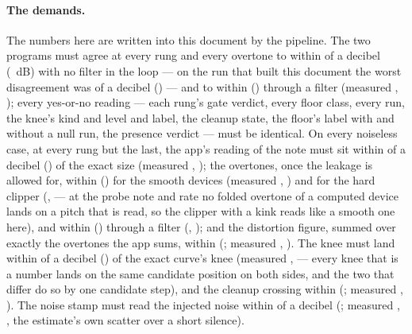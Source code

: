 \documentclass[11pt,a4paper]{article}
\begin{document}
\paragraph{The demands.} The numbers here are written into this document
by the pipeline. The two programs must agree at every rung and every overtone to within
\cparitySwiftToleranceWords{} of a decibel (\cparitySwiftTolerance{}~dB)
with no filter in the loop --- on the run that built this document the
worst disagreement was \cparityWorstSwiftWords{} of a decibel
(\cparityWorstSwift{}) --- and to within
\cparitySwiftFilteredToleranceWords{} (\cparitySwiftFilteredTolerance{})
through a filter (measured \cparityWorstSwiftFilteredWords{},
\cparityWorstSwiftFiltered{}); every yes-or-no reading --- each rung's
gate verdict, every floor class, every run, the knee's kind and level and
label, the cleanup state, the floor's label with and without a null run,
the presence verdict --- must be identical. On every noiseless case, at
every rung but the last, the app's reading of the note must sit within
\cparityHOneWords{} of a decibel (\cparityHOne{}) of the exact size
(measured \cparityWorstHOneWords{}, \cparityWorstHOne{}); the overtones,
once the leakage is allowed for, within \cparityTruthSmoothWords{}
(\cparityTruthSmooth{}) for the smooth devices (measured
\cparityWorstResidueSmoothWords{}, \cparityWorstResidueSmooth{}) and for
the hard clipper (\cparityWorstResidueKinkedWords{},
\cparityWorstResidueKinked{} --- at the probe note and rate no folded
overtone of a computed device lands on a pitch that is read, so the
clipper with a kink reads like a smooth one here), and within
\cparityTruthFilteredWords{} (\cparityTruthFiltered{}) through a filter
(\cparityWorstResidueFilteredWords{}, \cparityWorstResidueFiltered{}); and
the distortion figure, summed over exactly the overtones the app sums,
within \cparityTHDWords{} (\cparityTHD{}; measured
\cparityWorstTHDResidueWords{}, \cparityWorstTHDResidue{}). The knee must
land within \cparityKneeWords{} of a decibel (\cparityKnee{}) of the exact
curve's knee (measured \cparityWorstKneeWords{}, \cparityWorstKnee{} ---
every knee that is a number lands on the same candidate position on both
sides, and the two that differ do so by one candidate step), and the
cleanup crossing within \cparityCleanupWords{} (\cparityCleanup{};
measured \cparityWorstCleanupWords{}, \cparityWorstCleanup{}). The noise
stamp must read the injected noise within \cparityStampWords{} of a
decibel (\cparityStamp{}; measured \cparityStampErrorWords{},
\cparityStampError{}, the estimate's own scatter over a short silence).
\end{document}
